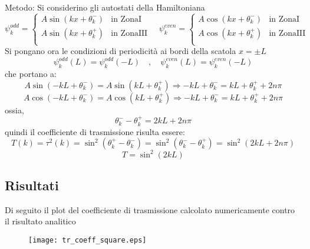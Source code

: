 \begin{paragraph}{Metodo:}
Si considerino gli autostati della Hamiltoniana
$$ \psi_k^{odd} = \begin{cases}
    A\sin(kx + \theta^-_k) & \mbox{in ZonaI} \\
    A\sin(kx + \theta^+_k) & \mbox{in ZonaIII} \\
\end{cases}
\quad
\psi_k^{even} = \begin{cases}
    A\cos(kx + \theta^-_k) & \mbox{in ZonaI} \\
    A\cos(kx + \theta^+_k) & \mbox{in ZonaIII} \\
\end{cases}
$$
Si pongano ora le condizioni di periodicità ai bordi della scatola $x = \pm L$
    $$  \psi_k^{odd}(L) = \psi_k^{odd}(-L) \quad,\quad \psi_k^{even}(L) = \psi_k^{even}(-L)$$
che portano a:
$$ A\sin(-kL + \theta^-_k) = A\sin(kL + \theta^+_k) \Rightarrow -kL + \theta^-_k = kL + \theta^+_k + 2n\pi $$
$$ A\cos(-kL + \theta^-_k) = A\cos(kL + \theta^+_k) \Rightarrow -kL + \theta^-_k = kL + \theta^+_k + 2n\pi $$
ossia,
      $$ \theta^-_k - \theta^+_k = 2kL + 2n\pi $$
quindi il coefficiente di trasmissione risulta essere:
    $$ T(k) = \tau^2(k) = \sin^2(\theta_k^+ - \theta_k^-) = \sin^2(\theta_k^- - \theta_k^+) = \sin^2(2kL + 2n\pi) $$
    $$ T = \sin^2(2kL) $$
\end{paragraph}

%
\newpage
\subsection*{Risultati}
Di seguito il plot del coefficiente di trasmissione calcolato numericamente contro
il risultato analitico

\begin{figure}[h]
\centering
  \texttt{[image: tr\_coeff\_square.eps]}
\end{figure}
